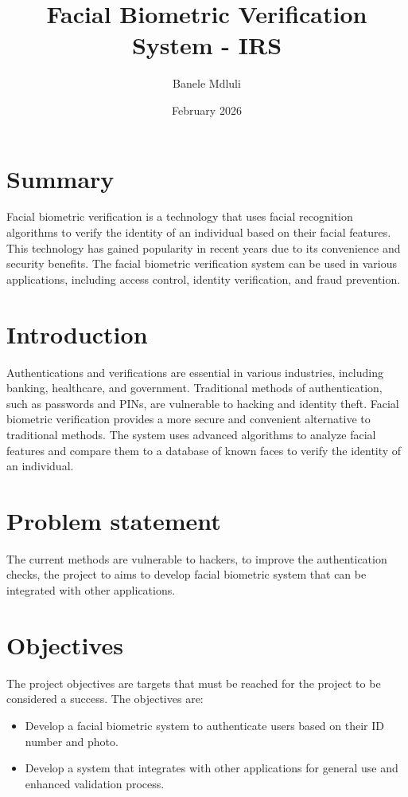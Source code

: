 \documentclass{article}
\title{Facial Biometric Verification System - IRS}
\author{Banele Mdluli}
\date{February 2026}
\begin{document}
\maketitle
\newpage
\section{Summary}
Facial biometric verification is a technology that uses facial recognition algorithms to verify the identity of an individual based on their facial features. This technology has gained popularity in recent years due to its convenience and security benefits. The facial biometric verification system can be used in various applications, including access control, identity verification, and fraud prevention.

\section{Introduction}
Authentications and verifications are essential in various industries, including banking, healthcare, and government. Traditional methods of authentication, such as passwords and PINs, are vulnerable to hacking and identity theft. 
Facial biometric verification provides a more secure and convenient alternative to traditional methods. The system uses advanced algorithms to analyze facial features and compare them to a database of known faces to verify the identity of an individual.


\section{Problem statement}
The current methods are vulnerable to hackers, to improve the authentication checks, the project to aims to develop facial biometric system that can be integrated with other applications.


\section{Objectives}
The project objectives are targets that must be reached for the project to be considered a success. The objectives are:
\begin{itemize}
    \item Develop a facial biometric system to authenticate users based on their ID number and photo.
    \item Develop a system that integrates with other applications for general use and enhanced validation process.
\end{itemize}
\end{document}
